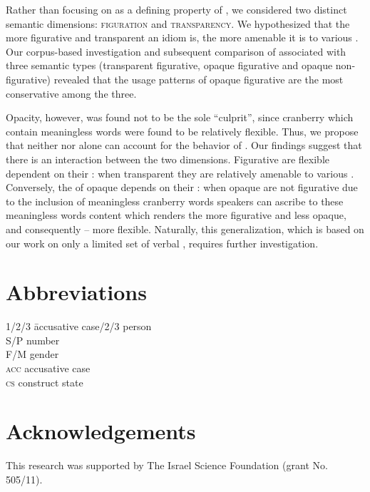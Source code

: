 \documentclass[output=paper]{langsci/langscibook}
\begin{document}
Rather than focusing on  as a defining property of , we considered two distinct semantic dimensions: {\scshape figuration} and {\scshape transparency}. We hypothesized that the more figurative and transparent an idiom is, the more amenable it is to various . Our corpus-based investigation and subsequent comparison of  associated with three semantic types (transparent figurative, opaque figurative and opaque non-figurative) revealed that the usage patterns of opaque figurative  are the most conservative among the three.

Opacity, however, was found not to be the sole ``culprit'', since cranberry  which contain meaningless words were found to be relatively flexible. Thus, we propose that neither  nor  alone can account for the behavior of . Our findings suggest that there is an interaction between the two dimensions. Figurative  are flexible dependent on their : when transparent they are relatively amenable to various . Conversely, the  of opaque  depends on their : when opaque  are not figurative due to the inclusion of meaningless cranberry words speakers can ascribe to these meaningless words content which renders the  more figurative and less opaque, and consequently -- more flexible. Naturally, this generalization, which is based on our work on only a limited set of  verbal , requires further investigation.

\newpage\section*{Abbreviations}
\begin{multicols}{2}
\begin{tabbing}
1/2/3 \hspace{1em} \= accusative case/2/3 \> person\\
S/P   \> number\\
F/M   \> gender\\
\textsc{acc}\> accusative case \\
\textsc{cs} \> construct state \\
\end{tabbing}
\end{multicols}

\section*{Acknowledgements}
This research was supported by The Israel Science Foundation (grant No. 505/11).


\printbibliography[heading=subbibliography,notkeyword=this]
\end{document}

